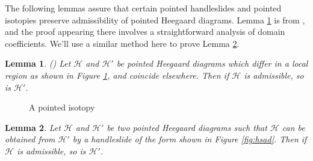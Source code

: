 \documentclass[11pt]{article}
\theoremstyle{plain} \newtheorem{thm}{Theorem}[subsection]
\theoremstyle{plain} \newtheorem{cor}[thm]{Corollary}
\theoremstyle{plain} \newtheorem{prop}[thm]{Proposition}
\theoremstyle{plain} \newtheorem{conj}[thm]{Conjecture}
\theoremstyle{plain} \newtheorem{lem}[thm]{Lemma}
\theoremstyle{definition} \newtheorem{df}[thm]{Definition}
\theoremstyle{remark} \newtheorem{rmk}[thm]{Remark}
\theoremstyle{remark} \newtheorem{obs}[thm]{Observation}
\newcommand{\h}{\mathcal{H}}
\numberwithin{equation}{section}
\begin{document}
The following lemmas assure that certain pointed handleslides and pointed isotopies preserve admissibility of pointed Heegaard diagrams.  Lemma \ref{lem:isoad} is from \cite{sw:CHF}, and the proof appearing there involves a straightforward analysis of domain coefficients.  We'll use a similar method here to prove Lemma \ref{lem:hsad}.

\begin{lem}\label{lem:isoad}(\cite{sw:CHF})
Let $\h$ and $\h'$ be pointed Heegaard diagrams which differ in a local region as shown in Figure \ref{fig:isoad}, and coincide elsewhere.  Then if $\h$ is admissible, so is $\h'$.
\end{lem}

\begin{figure}[h!]
\centering
\begin{minipage}[c]{.60\linewidth}
\qquad
{}
\end{minipage}
\begin{minipage}[c]{.35\linewidth}
\caption{A pointed isotopy\label{fig:isoad}}
\end{minipage}
\end{figure}

\begin{lem}\label{lem:hsad}
Let $\h$ and $\h'$ be two pointed Heegaard diagrams such that $\h$ can be obtained from $\h'$ by a handleslide of the form shown in Figure \ref{fig:hsad}.  Then if $\h$ is admissible, so is $\h'$.
 \end{lem}
 
\end{document}

